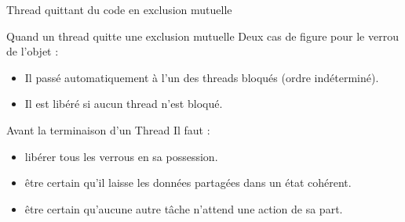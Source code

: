 
\begingroup

\begin{frame}{Thread quittant du code en exclusion mutuelle}
  
  \begin{block}{Quand un thread quitte une exclusion mutuelle}
    Deux cas de figure pour le verrou de l'objet :
    \begin{itemize}
    \item  Il  passé  automatiquement à  l'un  des threads  bloqués
      (ordre indéterminé).
    \item Il est libéré si aucun thread n'est bloqué.
    \end{itemize}
  \end{block}
  
  \bigskip
  
  \begin{alertblock}{Avant la terminaison d'un Thread}
    Il faut :
    \begin{itemize}
    \item \alert{libérer tous les verrous en sa possession.}
    \item être certain qu'il laisse les données partagées dans un état cohérent.
    \item être certain qu'aucune autre tâche n'attend une action de sa part.
    \end{itemize}
  \end{alertblock}
\end{frame}

\endgroup
\endinput
